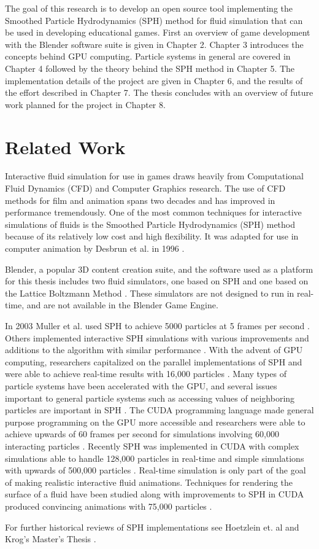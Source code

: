 The goal of this research is to develop an open source tool implementing the
Smoothed Particle Hydrodynamics (SPH) method for fluid simulation that can be
used in developing educational games. First an overview of game development
with the Blender software suite is given in Chapter 2.  
Chapter 3 introduces the concepts behind GPU computing. Particle systems in
general are covered in Chapter 4 followed by the theory behind the SPH method
in Chapter 5. The implementation details of the project are given in Chapter 6,
and the results of the effort described in Chapter 7. The thesis concludes with
an overview of future work planned for the project in Chapter 8. 


\section{Related Work}

Interactive fluid simulation for use in games draws heavily from Computational
Fluid Dynamics (CFD) and Computer Graphics research. The use of CFD methods for
film and animation spans two decades \cite{Tan2009} and has improved in
performance tremendously. One of the most common techniques for interactive
simulations of fluids is the Smoothed Particle Hydrodynamics (SPH) method
because of its relatively low cost and high flexibility. It was adapted for use
in computer animation by Desbrun et al. in 1996 \cite{Desbrun1996}. 


Blender, a popular 3D content creation suite, and the software used as a
platform for this thesis includes two fluid simulators, one based on SPH
\cite{Clavet2005} and one based on the Lattice Boltzmann Method
\cite{Nils2006}. These simulators are not designed to run in real-time,
and are not available in the Blender Game Engine. 


In 2003 Muller et al. used SPH to achieve 5000 particles at 5 frames per
second \cite{Muller2003}.  Others implemented interactive SPH simulations with
various improvements and additions to the algorithm with similar
performance \cite{Kallin2009}\cite{Kelager2006}.
With the advent of GPU computing, researchers capitalized on the parallel
implementations of SPH and were able to achieve real-time results with 16,000 particles \cite{Harada2007a}.
Many types of particle systems have been accelerated with the GPU, and several issues
important to general particle systems such as accessing values of neighboring
particles are important in SPH \cite{Knowles2009}.
The CUDA programming language made general purpose programming on the GPU more
accessible and researchers were able to achieve upwards of 60 frames per second
for simulations involving 60,000 interacting particles \cite{Seizinger2010}.
Recently SPH was implemented in CUDA with complex simulations able to handle
128,000 particles in real-time and simple simulations with upwards of 500,000
particles \cite{Krog2010}. Real-time simulation is only part of the goal of making
realistic interactive fluid animations. Techniques for rendering the
surface of a fluid have been studied along with improvements to SPH in CUDA 
produced convincing animations with 75,000 particles \cite{Goswami2010}.


For further historical reviews of SPH implementations see Hoetzlein et.
al \cite{Hoetzlein} and Krog's Master's Thesis \cite{Krog2010}.



